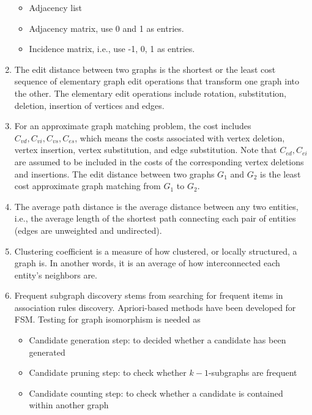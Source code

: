 \documentclass[14pt]{article}
\begin{document}
\begin{enumerate}
\begin{itemize}
   \item Adjacency list
   \item Adjacency matrix, use 0 and 1 as entries.
   \item Incidence matrix, i.e., use -1, 0, 1 as entries.
  \end{itemize}
 \item The edit distance between two graphs is the shortest or the least cost sequence of elementary graph edit operations that transform one graph into the other. The elementary edit operations include rotation, substitution, deletion, insertion of vertices and edges.
 \item For an approximate graph matching problem, the cost includes $C_{vd}, C_{vi}, C_{vs}, C_{es}$, which means the costs associated with vertex deletion, vertex insertion, vertex substitution, and edge substitution. Note that $C_{ed}, C_{ei}$ are assumed to be included in the costs of the corresponding vertex deletions and insertions. The edit distance between two graphs $G_1$ and $G_2$ is the least cost approximate graph matching from $G_1$ to $G_2$.
 \item The average path distance is the average distance between any two entities, i.e., the average length of the shortest path connecting each pair of entities (edges are unweighted and undirected).
 \item Clustering coefficient is a measure of how clustered, or locally structured, a graph is. In another words, it is an average of how interconnected each entity's neighbors are.
 \item Frequent subgraph discovery stems from searching for frequent items in association rules discovery. Apriori-based methods have been developed for FSM. Testing for graph isomorphism is needed as 
    \begin{itemize}
     \item Candidate generation step: to decided whether a candidate has been generated
     \item Candidate pruning step: to check whether $k-1$-subgraphs are frequent
     \item Candidate counting step: to check whether a candidate is contained within another graph
    \end{itemize}
\end{enumerate}
\end{document}
